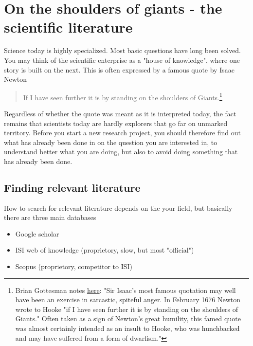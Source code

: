 \documentclass{tufte-book}
\begin{document}


\chapter{On the shoulders of giants - the scientific literature}

Science today is highly specialized. Most basic questions have long been solved. You may think of the scientific enterprise as a "house of knowledge", where one story is built on the next. This is often expressed by a famous quote by Isaac Newton 

\begin{quote}
If I have seen further it is by standing on the shoulders of Giants.\footnote{Brian Gottesman notes \href{http://mentalfloss.com/article/24520/6-things-you-should-know-about-isaac-newton}{here}: "Sir Isaac's most famous quotation may well have been an exercise in sarcastic, spiteful anger. In February 1676 Newton wrote to Hooke "if I have seen further it is by standing on the shoulders of Giants." Often taken as a sign of Newton's great humility, this famed quote was almost certainly intended as an insult to Hooke, who was hunchbacked and may have suffered from a form of dwarfism."}
\end{quote}

Regardless of whether the quote was meant as it is interpreted today, the fact remains that scientists today are hardly explorers that go far on unmarked territory. Before you start a new research project, you should therefore find out what has already been done in on the question you are interested in, to understand better what you are doing, but also to avoid doing something that has already been done. 


\section{Finding relevant literature}

How to search for relevant literature depends on the your field, but basically there are three main databases

\begin{itemize}
\item Google scholar 
\item ISI web of knowledge (proprietory, slow, but most "official")
\item Scopus (proprietory, competitor to ISI)
\end{itemize}
\end{document}

